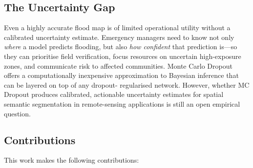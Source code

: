 \documentclass[12pt]{article}
\begin{document}
\subsection{The Uncertainty Gap}

Even a highly accurate flood map is of limited operational utility without a
calibrated uncertainty estimate.  Emergency managers need to know not only
\emph{where} a model predicts flooding, but also \emph{how confident} that
prediction is—so they can prioritise field verification, focus resources on
uncertain high-exposure zones, and communicate risk to affected communities.
Monte Carlo Dropout \cite{gal2016dropout} offers a computationally inexpensive
approximation to Bayesian inference that can be layered on top of any dropout-
regularised network.  However, whether MC Dropout produces calibrated,
actionable uncertainty estimates for spatial semantic segmentation in
remote-sensing applications is still an open empirical question.

\subsection{Contributions}

This work makes the following contributions:
\end{document}
